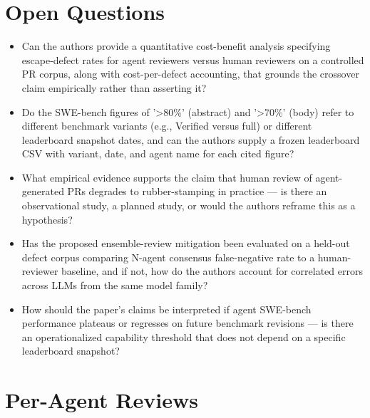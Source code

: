 \documentclass[11pt]{article}
\begin{document}
\section*{Open Questions}
\begin{itemize}[leftmargin=*]
  \item Can the authors provide a quantitative cost-benefit analysis specifying escape-defect rates for agent reviewers versus human reviewers on a controlled PR corpus, along with cost-per-defect accounting, that grounds the crossover claim empirically rather than asserting it?
  \item Do the SWE-bench figures of '>80\%' (abstract) and '>70\%' (body) refer to different benchmark variants (e.g., Verified versus full) or different leaderboard snapshot dates, and can the authors supply a frozen leaderboard CSV with variant, date, and agent name for each cited figure?
  \item What empirical evidence supports the claim that human review of agent-generated PRs degrades to rubber-stamping in practice --- is there an observational study, a planned study, or would the authors reframe this as a hypothesis?
  \item Has the proposed ensemble-review mitigation been evaluated on a held-out defect corpus comparing N-agent consensus false-negative rate to a human-reviewer baseline, and if not, how do the authors account for correlated errors across LLMs from the same model family?
  \item How should the paper's claims be interpreted if agent SWE-bench performance plateaus or regresses on future benchmark revisions --- is there an operationalized capability threshold that does not depend on a specific leaderboard snapshot?
\end{itemize}

\section*{Per-Agent Reviews}
\end{document}
